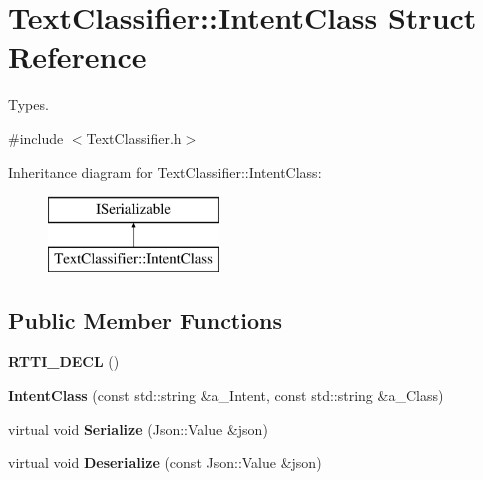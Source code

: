 \hypertarget{struct_text_classifier_1_1_intent_class}{}\section{Text\+Classifier\+:\+:Intent\+Class Struct Reference}
\label{struct_text_classifier_1_1_intent_class}


Types.  




{\ttfamily \#include $<$Text\+Classifier.\+h$>$}

Inheritance diagram for Text\+Classifier\+:\+:Intent\+Class\+:\begin{figure}[H]
\begin{center}
\leavevmode
\includegraphics[height=2.000000cm]{struct_text_classifier_1_1_intent_class}
\end{center}
\end{figure}
\subsection*{Public Member Functions}
\begin{DoxyCompactItemize}
\item 
\mbox{\label{struct_text_classifier_1_1_intent_class_a158b86e740823fb4124892616403bc74}} 
{\bfseries R\+T\+T\+I\+\_\+\+D\+E\+CL} ()
\item 
\mbox{\label{struct_text_classifier_1_1_intent_class_af8076d623baccc08b661dc6807092776}} 
{\bfseries Intent\+Class} (const std\+::string \&a\+\_\+\+Intent, const std\+::string \&a\+\_\+\+Class)
\item 
\mbox{\label{struct_text_classifier_1_1_intent_class_a913e92c2569ac8e2caed774e1dd38276}} 
virtual void {\bfseries Serialize} (Json\+::\+Value \&json)
\item 
\mbox{\label{struct_text_classifier_1_1_intent_class_ae3af2738bbbdaa3ea3e43befcd411bbe}} 
virtual void {\bfseries Deserialize} (const Json\+::\+Value \&json)
\end{DoxyCompactItemize}

